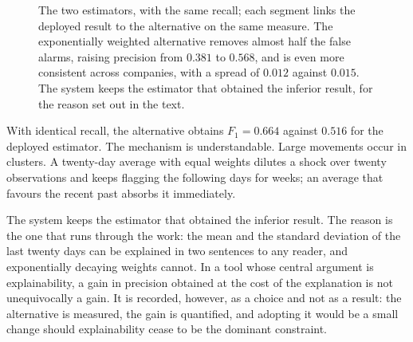 \begin{figure}[htbp]
\centering
{}
\caption[Two volatility estimators under the same protocol]{The two estimators, with the same
recall; each segment links the deployed result to the alternative on the same measure. The
exponentially weighted alternative removes almost half the false alarms, raising precision from
$0.381$ to $0.568$, and is even more consistent across companies, with a spread of $0.012$ against
$0.015$. The system keeps the estimator that obtained the inferior result, for the reason set out
in the text.}
\label{fig:av_ewma}
\end{figure}

With identical recall, the alternative obtains $F_1 = 0.664$ against $0.516$ for the deployed
estimator. The mechanism is understandable. Large movements occur in clusters. A twenty-day average
with equal weights dilutes a shock over twenty observations and keeps flagging the following days
for weeks; an average that favours the recent past absorbs it immediately.

The system keeps the estimator that obtained the inferior result. The reason is the one that runs
through the work: the mean and the standard deviation of the last twenty days can be explained in
two sentences to any reader, and exponentially decaying weights cannot. In a tool whose central
argument is explainability, a gain in precision obtained at the cost of the explanation is not
unequivocally a gain. It is recorded, however, as a choice and not as a result: the alternative is
measured, the gain is quantified, and adopting it would be a small change should explainability
cease to be the dominant constraint.

